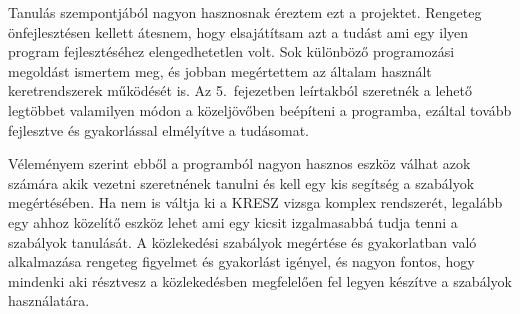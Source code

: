 \documentclass[
]{thesis-ekf}
\theoremstyle{definition}
\theoremstyle{remark}
\begin{document}
Tanulás szempontjából nagyon hasznosnak éreztem ezt a projektet. Rengeteg önfejlesztésen kellett átesnem, hogy elsajátítsam azt a tudást ami egy ilyen program fejlesztéséhez elengedhetetlen volt. Sok különböző programozási megoldást ismertem meg, és jobban megértettem az általam használt keretrendszerek működését is. Az 5.~fejezetben leírtakból szeretnék a lehető legtöbbet valamilyen módon a közeljövőben beépíteni a programba, ezáltal tovább fejlesztve és gyakorlással elmélyítve a tudásomat. 

Véleményem szerint ebből a programból nagyon hasznos eszköz válhat azok számára akik vezetni szeretnének tanulni és kell egy kis segítség a szabályok megértésében. Ha nem is váltja ki a KRESZ vizsga komplex rendszerét, legalább egy ahhoz közelítő eszköz lehet ami egy kicsit izgalmasabbá tudja tenni a szabályok tanulását. A közlekedési szabályok megértése és gyakorlatban való alkalmazása rengeteg figyelmet és gyakorlást igényel, és nagyon fontos, hogy mindenki aki résztvesz a közlekedésben megfelelően fel legyen készítve a szabályok használatára.
\end{document}
